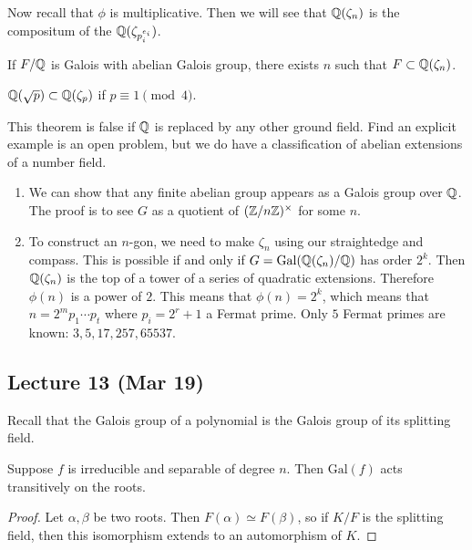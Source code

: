 \message{ !name(notes.tex)}\documentclass[10pt, twoside]{article}
\begin{document}
        Now recall that $\phi$ is multiplicative. Then we will see that $\mathbb{Q}(\zeta_n)$ is the compositum of the $\mathbb{Q}(\zeta_{p_i^{e_i}})$.

        \begin{thm}
            If $F/\mathbb{Q}$ is Galois with abelian Galois group, there exists $n$ such that $F \subset \mathbb{Q}(\zeta_n)$.
        \end{thm}

        \begin{exm}
            $\mathbb{Q}(\sqrt{p}) \subset \mathbb{Q}(\zeta_p)$ if $p \equiv 1 \pmod 4$.
        \end{exm}

        \begin{rmk}
            This theorem is false if $\mathbb{Q}$ is replaced by any other ground field. Find an explicit example is an open problem, but we do have a classification of abelian extensions of a number field.
        \end{rmk}

        \begin{rmk}
            \begin{enumerate}
                \item We can show that any finite abelian group appears as a Galois group over $\mathbb{Q}$. The proof is to see $G$ as a quotient of $(\mathbb{Z}/n\mathbb{Z})^{\times}$ for some $n$.
                \item To construct an $n$-gon, we need to make $\zeta_n$ using our straightedge and compass. This is possible if and only if $G = \mathrm{Gal}(\mathbb{Q}(\zeta_n)/\mathbb{Q})$ has order $2^k$. Then $\mathbb{Q}(\zeta_n)$ is the top of a tower of a series of quadratic extensions. Therefore $\phi(n)$ is a power of $2$. This means that $\phi(n) = 2^k$, which means that $n = 2^mp_1\cdots p_t$ where $p_i = 2^r+1$ a Fermat prime. Only $5$ Fermat primes are known: $3,5,17,257,65537$.
            \end{enumerate}
        \end{rmk}

        \subsection{Lecture 13 (Mar 19)}
        Recall that the Galois group of a polynomial is the Galois group of its splitting field.

        \begin{prop}
            Suppose $f$ is irreducible and separable of degree $n$. Then $\mathrm{Gal}(f)$ acts transitively on the roots.
            \begin{proof}
                Let $\alpha, \beta$ be two roots. Then $F(\alpha) \simeq F(\beta)$, so if $K/F$ is the splitting field, then this isomorphism extends to an automorphism of $K$.
            \end{proof}
        \end{prop}
\end{document}
